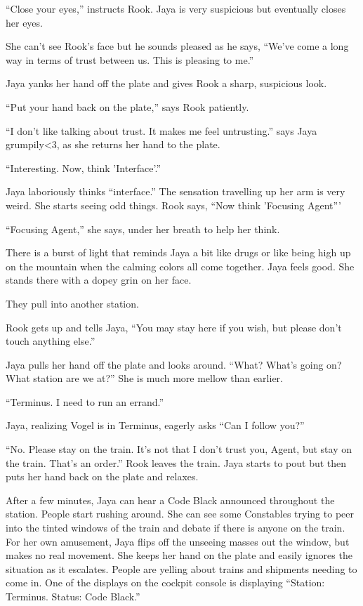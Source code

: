 ``Close your eyes,'' instructs Rook.  Jaya is very suspicious but eventually closes her eyes.

She can't see Rook's face but he sounds pleased as he says, ``We've come a long way in terms of trust between us.  This is pleasing to me.''

Jaya yanks her hand off the plate and gives Rook a sharp, suspicious look.

``Put your hand back on the plate,'' says Rook patiently.

``I don't like talking about trust. It makes me feel untrusting.'' says Jaya grumpily\textless 3, as she returns her hand to the plate.

``Interesting.  Now, think 'Interface'.''

Jaya laboriously thinks ``interface.''  The sensation travelling up her arm is very weird.   She starts seeing odd things.  Rook says, ``Now think 'Focusing Agent'''

``Focusing Agent,'' she says, under her breath to help her think.

There is a burst of light that reminds Jaya a bit like drugs or like being high up on the mountain when the calming colors all come together.  Jaya feels good.  She stands there with a dopey grin on her face.



They pull into another station.

Rook gets up and tells Jaya, ``You may stay here if you wish, but please don't touch anything else.''

Jaya pulls her hand off the plate and looks around.  ``What?  What's going on?  What station are we at?''  She is much more mellow than earlier.

``Terminus.  I need to run an errand.''

Jaya, realizing Vogel is in Terminus, eagerly asks  ``Can I follow you?''

``No.  Please stay on the train. It's not that I don't trust you, Agent, but stay on the train.  That's an order.''  Rook leaves the train.  Jaya starts to pout but then puts her hand back on the plate and relaxes.



After a few minutes, Jaya can hear a Code Black announced throughout the station.  People start rushing around.   She can see some Constables trying to peer into the tinted windows of the train and debate if there is anyone on the train.  For her own amusement, Jaya flips off the unseeing masses out the window, but makes no real movement.  She keeps her hand on the plate and easily ignores the situation as it escalates.  People are yelling about trains and shipments needing to come in.  One of the displays on the cockpit console is displaying ``Station: Terminus.  Status: Code Black.''



